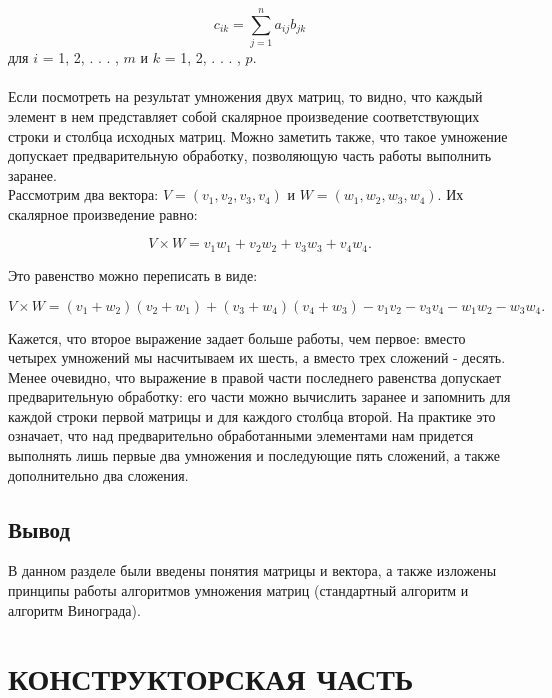 \documentclass[a4paper,12pt]{article}
\begin{document}
\begin{equation}
c_{ik} = \sum \limits_{j=1}^{n} a_{ij}b_{jk}
\end{equation}
для $i$ = 1, 2, . . . , $m$ и $k$ = 1, 2, . . . , $p$. \\
\\
Если посмотреть на результат умножения двух матриц, то видно, что каждый элемент в нем представляет собой скалярное произведение соответствующих строки и столбца исходных матриц. Можно заметить также, что такое умножение допускает предварительную обработку, позволяющую часть работы выполнить заранее. \\
Рассмотрим два вектора: $V = (v_1, v_2, v_3, v_4)$ и $W = (w_1, w_2, w_3, w_4)$. Их скалярное произведение равно:
\begin{center}
\begin{equation}
V × W = v_1w_1 + v_2w_2 + v_3w_3 + v_4w_4.
\end{equation}
\end{center}
Это равенство можно переписать в виде:
\begin{center}
\begin{equation}
V × W = (v_1 + w_2)(v_2 + w_1) + (v_3 + w_4)(v_4 + w_3) - v_1v_2 - v_3v_4 - w_1w_2 - w_3w_4.
\end{equation}
\end{center}
Кажется, что второе выражение задает больше работы, чем первое: вместо четырех умножений мы насчитываем их шесть, а вместо трех сложений - десять. Менее очевидно, что выражение в правой части последнего равенства допускает предварительную обработку: его части можно вычислить заранее и запомнить для каждой строки первой матрицы и для каждого столбца второй. На практике это означает, что над предварительно обработанными элементами нам придется выполнять лишь первые два умножения и последующие пять сложений, а также дополнительно два сложения. 

\newpage
\subsection{Вывод}
В данном разделе были введены понятия матрицы и вектора, а также изложены принципы работы алгоритмов умножения матриц (стандартный алгоритм и алгоритм Винограда).

\newpage
\section{КОНСТРУКТОРСКАЯ ЧАСТЬ}
\end{document}
